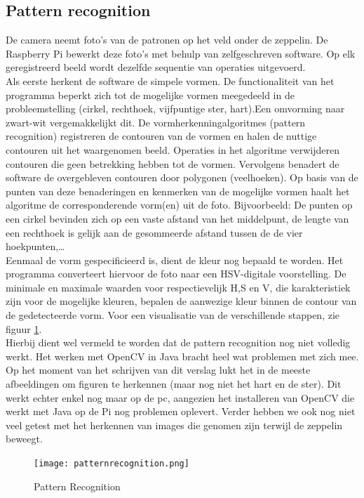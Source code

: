 \documentclass[tt]{penoverslag}
\begin{document}
\subsection{Pattern recognition}
De camera neemt foto’s van de patronen op het veld onder de zeppelin. De Raspberry Pi bewerkt deze foto’s met behulp van zelfgeschreven software. Op elk geregistreerd beeld wordt dezelfde sequentie van operaties uitgevoerd. \\
Als eerste herkent de software de simpele vormen. De functionaliteit van het programma beperkt zich tot de mogelijke vormen meegedeeld in de probleemstelling (cirkel, rechthoek, vijfpuntige ster, hart).Een omvorming naar zwart-wit vergemakkelijkt dit. De vormherkenningalgoritmes (pattern recognition) registreren de contouren van de vormen en halen de nuttige contouren uit het waargenomen beeld. Operaties in het algoritme verwijderen contouren die geen betrekking hebben tot de vormen. Vervolgens benadert de software de overgebleven contouren door polygonen (veelhoeken). Op basis van de punten van deze benaderingen en kenmerken van de mogelijke vormen haalt het algoritme de corresponderende vorm(en) uit de foto. Bijvoorbeeld: De punten op een cirkel bevinden zich op een vaste afstand van het middelpunt, de lengte van een rechthoek is gelijk aan de gesommeerde afstand tussen de de vier hoekpunten,\ldots \\
Eenmaal de vorm gespecificieerd is, dient de kleur nog bepaald te worden.  Het programma converteert hiervoor de foto naar een HSV-digitale voorstelling. De minimale en maximale waarden voor respectievelijk H,S en V, die karakteristiek zijn voor de mogelijke kleuren, bepalen de aanwezige kleur binnen de contour van de gedetecteerde vorm. Voor een visualisatie van de verschillende stappen, zie figuur \ref{Patterns}. \\

Hierbij dient wel vermeld te worden dat de pattern recognition nog niet volledig werkt. Het werken met OpenCV in Java bracht heel wat problemen met zich mee. Op het moment van het schrijven van dit verslag lukt het in de meeste afbeeldingen om figuren te herkennen (maar nog niet het hart en de ster). Dit werkt echter enkel nog maar op de pc, aangezien het installeren van OpenCV die werkt met Java op de Pi nog problemen oplevert. Verder hebben we ook nog niet veel getest met het herkennen van images die genomen zijn terwijl de zeppelin beweegt.

\begin{figure}[H]
\begin{center}
\texttt{[image: patternrecognition.png]}
\end{center}
\caption{Pattern Recognition}
\label{Patterns}
\end{figure}
\end{document}
